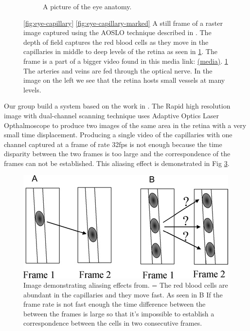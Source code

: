 \documentclass[]{article}
\begin{document}
\begin{figure}
\begin{subfigure}[t]{\textwidth}
		\caption{A picture of the eye anatomy\cite{eye_anatomy}.}
		\label{fig:eye-anatomy}
	\end{subfigure}
	\caption{\ref{fig:eye-capillary} \ref{fig:eye-capillary-marked} A still frame of a raster image captured using the AOSLO technique described in \cite{castro_rapid_2016}.
		The depth of field captures the red blood cells as they move in the capillaries in middle to deep levels of the retina as seen in \ref{fig:eye-anatomy}.
		The frame is a part of a bigger video found in this media link: \href{https://youtu.be/-7ew5sqOaTo}{(media)}.
	\ref{fig:eye-anatomy} The arteries and veins are fed through the optical nerve.
	In the image on the left\cite{noauthor_varying_nodate} we see that the retina hosts
	small vessels at many levels. }
	\label{fig:own-retinal-capillaries}
\end{figure}

Our group build a system based on the work in \cite{castro_rapid_2016}.
The Rapid high resolution image with dual-channel scanning technique uses Adaptive Optics Laser Opthalmoscope to produce two images of the same area in the retina with a very small time displacement.
Producing a single video of the capillaries with one channel captured at a frame of rate 32fps is not
enough because the time disparity between the two frames is too large and the correspondence of the frames can not be established.
This aliasing effect is demonstrated in Fig \ref{fig:aliasing-effect}.

\begin{figure}[ht]
	\includegraphics[width=\textwidth]{aliasing-effect.jpg}
	\caption{Image demonstrating aliasing effects from\cite{japee_automated_2005}. =
		 The red blood cells are abundant in the capillaries and they move fast.
	     As seen in B If the frame rate is not fast enough the time difference between the 
     	 between the frames is large so that it's impossible to establish a correspondence 
     	 between the cells in two consecutive frames.}
	\label{fig:aliasing-effect}
\end{figure}
\end{document}
